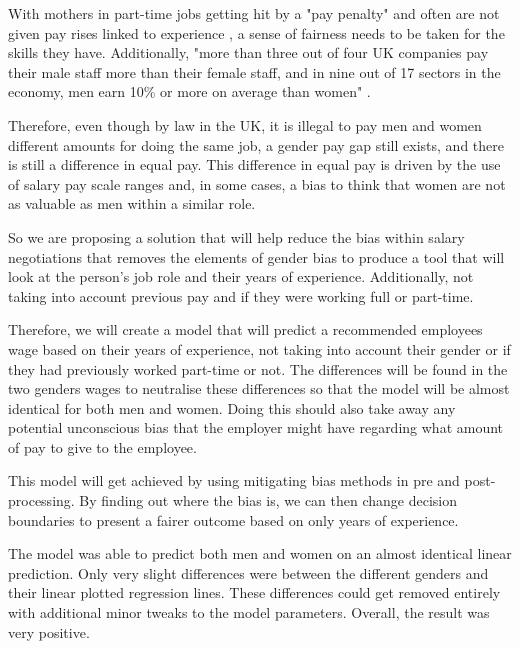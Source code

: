 \documentclass{sigchi}
\begin{document}


	With mothers in part-time jobs getting hit by a "pay penalty" and often are not given pay rises linked to experience \cite{bbc_mothers_suffering}, a sense of fairness needs to be taken for the skills they have. Additionally, "more than three out of four UK companies pay their male staff more than their female staff, and in nine out of 17 sectors in the economy, men earn 10\% or more on average than women" \cite{gender_pay_FT}.%

	Therefore, even though by law in the UK, it is illegal to pay men and women different amounts for doing the same job, a gender pay gap still exists, and there is still a difference in equal pay. This difference in equal pay is driven by the use of salary pay scale ranges and, in some cases, a bias to think that women are not as valuable as men within a similar role.
	
	So we are proposing a solution that will help reduce the bias within salary negotiations that removes the elements of gender bias to produce a tool that will look at the person's job role and their years of experience. Additionally, not taking into account previous pay and if they were working full or part-time.

	Therefore, we will create a model that will predict a recommended employees wage based on their years of experience, not taking into account their gender or if they had previously worked part-time or not. The differences will be found in the two genders wages to neutralise these differences so that the model will be almost identical for both men and women. Doing this should also take away any potential unconscious bias that the employer might have regarding what amount of pay to give to the employee.
	
	This model will get achieved by using mitigating bias methods in pre and post-processing. By finding out where the bias is, we can then change decision boundaries to present a fairer outcome based on only years of experience.

	The model was able to predict both men and women on an almost identical linear prediction. Only very slight differences were between the different genders and their linear plotted regression lines. These differences could get removed entirely with additional minor tweaks to the model parameters. Overall, the result was very positive.
\end{document}
